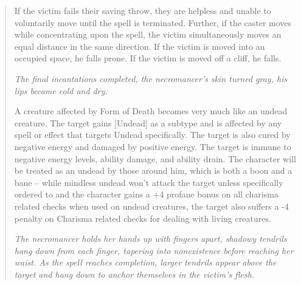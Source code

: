 \begin{quote}
If the victim fails their saving throw, they are helpless and unable to voluntarily move until the spell is terminated. Further, if the caster moves while concentrating upon the spell, the victim simultaneously moves an equal distance in the same direction. If the victim is moved into an occupied space, he falls prone. If the victim is moved off a cliff, he falls.\\

\begin{small}
\end{small}
\emph{The final incantations completed, the necromancer's skin turned gray, his lips became cold and dry.}

A creature affected by Form of Death becomes very much like an undead creature. The target gains [Undead] as a subtype and is affected by any spell or effect that targets Undead specifically. The target is also cured by negative energy and damaged by positive energy. The target is immune to negative energy levels, ability damage, and ability drain. The character will be treated as an undead by those around him, which is both a boon and a bane -- while mindless undead won't attack the target unless specifically ordered to and the character gains a +4 profane bonus on all charisma related checks when used on undead creatures, the target also suffers a -4 penalty on Charisma related checks for dealing with living creatures.\\

\begin{small}
\end{small}
\emph{The necromancer holds her hands up with fingers apart, shadowy tendrils hang down from each finger, tapering into nonexistence before reaching her waist. As the spell reaches completion, larger tendrils appear above the target and hang down to anchor themselves in the victim's flesh.}


\end{quote}

